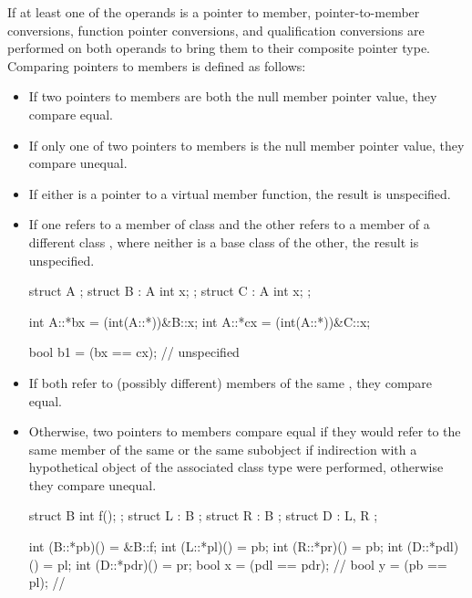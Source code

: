 \pnum
If at least one of the operands is a pointer to member,
pointer-to-member conversions,
function pointer conversions, and
qualification conversions
are performed on both operands to bring them to
their composite pointer type.
Comparing pointers to members is defined as follows:
\begin{itemize}
\item
If two pointers to members are both the null member pointer value, they compare
equal.

\item
If only one of two pointers to members is the null member pointer value, they
compare unequal.

\item
If either is a pointer to a virtual member function, the result is unspecified.

\item
If one refers to a member of class  and the other refers to a member
of a different class , where neither is a base class of the other,
the result is unspecified.
\begin{example}
\begin{codeblock}
struct A {};
struct B : A { int x; };
struct C : A { int x; };

int A::*bx = (int(A::*))&B::x;
int A::*cx = (int(A::*))&C::x;

bool b1 = (bx == cx);   // unspecified
\end{codeblock}
\end{example}

\item
If both refer to (possibly different) members of the same ,
they compare equal.

\item
Otherwise, two pointers to members compare equal if they would refer to the same member of
the same  or the same subobject if
indirection with a hypothetical object of the associated
class type were performed, otherwise they compare unequal.
\begin{example}
\begin{codeblock}
struct B {
  int f();
};
struct L : B { };
struct R : B { };
struct D : L, R { };

int (B::*pb)() = &B::f;
int (L::*pl)() = pb;
int (R::*pr)() = pb;
int (D::*pdl)() = pl;
int (D::*pdr)() = pr;
bool x = (pdl == pdr);          // 
bool y = (pb == pl);            // 
\end{codeblock}
\end{example}
\end{itemize}

